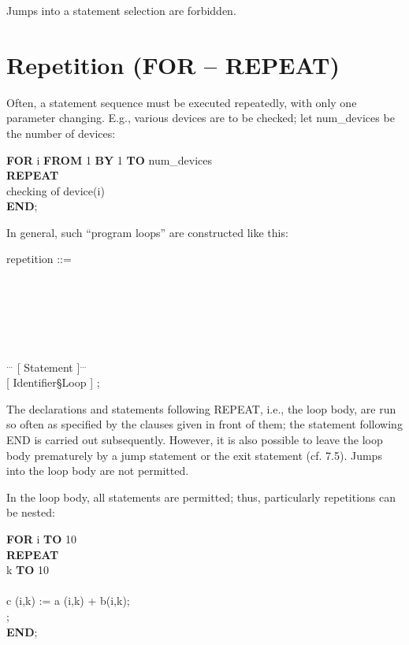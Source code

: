 Jumps into a statement selection are forbidden.

\section{Repetition (FOR -- REPEAT)}   %

Often, a statement sequence must be executed repeatedly, with only one
parameter changing. E.g., various devices are to be checked; let
num\_devices be the number of devices:

{\bf FOR} i {\bf FROM} 1 {\bf BY} 1 {\bf TO} num\_devices\\
{\bf REPEAT}\\
\x checking of device(i)\\
{\bf END};

In general, such ``program loops'' are constructed like this:

repetition ::= \\
 \\
 \\
 \\
 \\
 \\
 \\
\x [ Declaration ]$^{...}$ [ Statement ]$^{...}$ \\
 [ Identifier\S Loop ] ;

The declarations and statements following REPEAT, i.e., the loop body,
are run so often as specified by the clauses given in front of them; the
statement following END is carried out subsequently. However, it is also
possible to leave the loop body prematurely by a jump statement or the
exit statement (cf. 7.5). Jumps into the loop body are not permitted.

In the loop body, all statements are permitted; thus, particularly
repetitions can be nested:

{\bf FOR} i {\bf TO} 10\\
{\bf REPEAT} \\
 k {\bf TO} 10 \\
 \\
\x \x c (i,k) := a (i,k) + b(i,k);\\
;\\
{\bf END};

